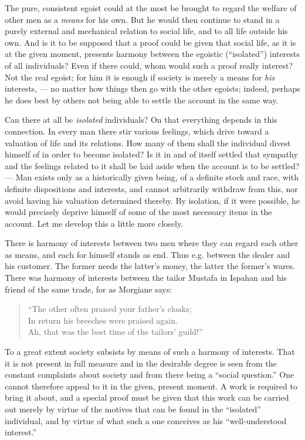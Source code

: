 \documentclass[12pt,a4paper,openany]{book}
\newcommand{\opage}[1]{\marginnote{\footnotesize\textit{[#1]}}}
\begin{document}
The pure, consistent egoist could at the most
be brought to regard the welfare of other men as a \emph{means}
for his own. But he would then continue to stand in a purely
external and mechanical relation to social life, and to all
life outside his own. And is it to be supposed that a proof could be given
that social life, as it is at the given moment,
presents harmony between the egoistic (``isolated'')
interests of all individuals? Even if there could, whom would such a
proof really interest? Not the real egoist; for him it is
enough if society is merely a means for \emph{his} interests,
--- no matter how things then go with the other egoists;
indeed, perhaps he does best by others not being able to
settle the account in the same way.

Can there at all be \emph{isolated} individuals?
On that everything depends in this connection. In every
man there stir various feelings, which drive toward
a valuation of life and its relations. How many of them
shall the individual divest himself of in order to become isolated? Is it
in and of itself settled that sympathy and the feelings related to it
shall be laid aside when the account is to be settled? --- Man
exists only as a historically given being, of a definite stock
and race, with definite dispositions and interests, and cannot
arbitrarily withdraw from this, nor avoid
having his valuation determined thereby. By
isolation, if it were possible, he would precisely deprive himself of some of the most
necessary items in the account. Let me develop this
a little more closely.

There is harmony of interests between two men where they
can regard each other as means, and each for himself stands
as end. Thus e.g. between the dealer and
\opage{35}his customer. The former needs the latter's money, the latter the former's
wares. There was harmony of interests between the tailor Mustafa
in Ispahan and his friend of the same trade, for as Morgiane
says:

\begin{verse}
``The other often praised your father's cloaks; \\
In return his breeches were praised again. \\
Ah, that was the best time of the tailors' guild!''
\end{verse}

To a great extent society subsists by means of
such a harmony of interests. That it is not present in
full measure and in the desirable degree is seen from the constant
complaints about society and from there being a ``social
question.'' One cannot therefore appeal to it
in the given, present moment. A work is required
to bring it about, and a special
proof must be given that this work can be carried out merely by virtue of
the motives that can be found in the ``isolated'' individual,
and by virtue of what such a one conceives as his ``well-understood
interest.''
\end{document}
